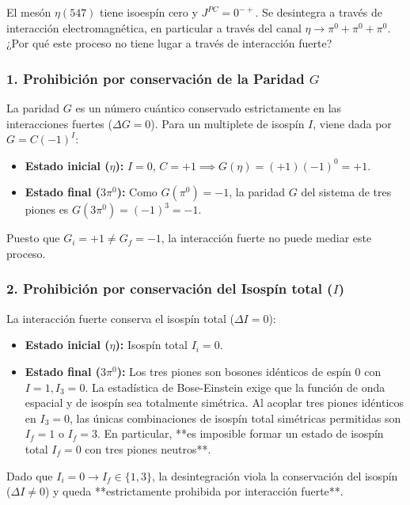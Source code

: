 \begin{problema}
El mesón $\eta(547)$ tiene isoespín cero y $J^{PC} = 0^{-+}$. Se desintegra a través de interacción electromagnética, en particular a través del canal $\eta \rightarrow \pi^0 + \pi^0 + \pi^0$. ¿Por qué este proceso no tiene lugar a través de interacción fuerte?

\tcblower

\subsubsection*{1. Prohibición por conservación de la Paridad $G$}

La paridad $G$ es un número cuántico conservado estrictamente en las interacciones fuertes ($\Delta G = 0$). Para un multiplete de isospín $I$, viene dada por $G = C (-1)^I$:
\begin{itemize}
    \item \textbf{Estado inicial ($\eta$):} $I = 0$, $C = +1 \implies G(\eta) = (+1) (-1)^0 = +1$.
    \item \textbf{Estado final ($3\pi^0$):} Como $G(\pi^0) = -1$, la paridad $G$ del sistema de tres piones es $G(3\pi^0) = (-1)^3 = -1$.
\end{itemize}
Puesto que $G_i = +1 \neq G_f = -1$, la interacción fuerte no puede mediar este proceso.

\subsubsection*{2. Prohibición por conservación del Isospín total ($I$)}

La interacción fuerte conserva el isospín total ($\Delta I = 0$):
\begin{itemize}
    \item \textbf{Estado inicial ($\eta$):} Isospín total $I_i = 0$.
    \item \textbf{Estado final ($3\pi^0$):} Los tres piones son bosones idénticos de espín 0 con $I=1, I_3=0$. La estadística de Bose-Einstein exige que la función de onda espacial y de isospín sea totalmente simétrica. Al acoplar tres piones idénticos en $I_3 = 0$, las únicas combinaciones de isospín total simétricas permitidas son $I_f = 1$ o $I_f = 3$. En particular, **es imposible formar un estado de isospín total $I_f = 0$ con tres piones neutros**.
\end{itemize}
Dado que $I_i = 0 \to I_f \in \{1, 3\}$, la desintegración viola la conservación del isospín ($\Delta I \neq 0$) y queda **estrictamente prohibida por interacción fuerte**.
\end{problema}

